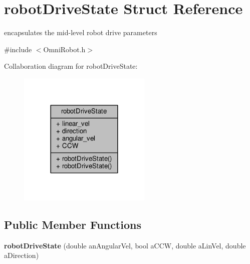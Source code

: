 \hypertarget{structrobot_drive_state}{}\section{robot\+Drive\+State Struct Reference}
\label{structrobot_drive_state}


encapsulates the mid-\/level robot drive parameters  




{\ttfamily \#include $<$Omni\+Robot.\+h$>$}



Collaboration diagram for robot\+Drive\+State\+:
\nopagebreak
\begin{figure}[H]
\begin{center}
\leavevmode
\includegraphics[width=180pt]{structrobot_drive_state__coll__graph}
\end{center}
\end{figure}
\subsection*{Public Member Functions}
\begin{DoxyCompactItemize}
\item 
\hypertarget{structrobot_drive_state_a731efd107a95b59c58e850702a9f6277}{}{\bfseries robot\+Drive\+State} (double an\+Angular\+Vel, bool a\+C\+C\+W, double a\+Lin\+Vel, double a\+Direction)\label{structrobot_drive_state_a731efd107a95b59c58e850702a9f6277}

\end{DoxyCompactItemize}
